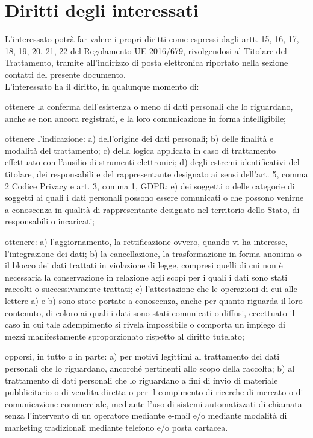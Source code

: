 \documentclass[legalpaper, 11pt]{exam}
\let\tempone\enumerate
\let\temptwo\endenumerate
\renewenvironment{enumerate}{\tempone\addtolength{\itemsep}{-0.45\baselineskip}}{\temptwo}
\begin{document}
{\section{Diritti degli interessati}
L’interessato potrà far valere i propri diritti come espressi dagli artt. 15, 16, 17, 18, 19, 20, 21, 22 del Regolamento UE 2016/679, rivolgendosi al Titolare del Trattamento, tramite all’indirizzo di posta elettronica riportato nella sezione contatti del presente documento. \\
L’interessato ha il diritto, in qualunque momento di:
\begin{enumerate}
	\item ottenere la conferma dell'esistenza o meno di dati personali che lo riguardano, anche se non ancora registrati, e la loro comunicazione in forma intelligibile;
	\item ottenere l'indicazione: a) dell'origine dei dati personali; b) delle finalità e modalità del trattamento; c) della logica applicata in caso di trattamento effettuato con l'ausilio di strumenti elettronici; d) degli estremi identificativi del titolare, dei responsabili e del rappresentante designato ai sensi dell'art. 5, comma 2 Codice Privacy e art. 3, comma 1, GDPR; e) dei soggetti o delle categorie di soggetti ai quali i dati personali possono essere comunicati o che possono venirne a conoscenza in qualità di rappresentante designato nel territorio dello Stato, di responsabili o incaricati;
	\item ottenere: a) l'aggiornamento, la rettificazione ovvero, quando vi ha interesse, l'integrazione dei dati; b) la cancellazione, la trasformazione in forma anonima o il blocco dei dati trattati in violazione di legge, compresi quelli di cui non è necessaria la conservazione in relazione agli scopi per i quali i dati sono stati raccolti o successivamente trattati; c) l'attestazione che le operazioni di cui alle lettere a) e b) sono state portate a conoscenza, anche per quanto riguarda il loro contenuto, di coloro ai quali i dati sono stati comunicati o diffusi, eccettuato il caso in cui tale adempimento si rivela impossibile o comporta un impiego di mezzi manifestamente sproporzionato rispetto al diritto tutelato;
	\item opporsi, in tutto o in parte: a) per motivi legittimi al trattamento dei dati personali che lo riguardano, ancorché pertinenti allo scopo della raccolta; b) al trattamento di dati personali che lo riguardano a fini di invio di materiale pubblicitario o di vendita diretta o per il compimento di ricerche di mercato o di comunicazione commerciale, mediante l’uso di sistemi automatizzati di chiamata senza l’intervento di un operatore mediante e-mail e/o mediante modalità di marketing tradizionali mediante telefono e/o posta cartacea.

\end{enumerate}}
\end{document}
